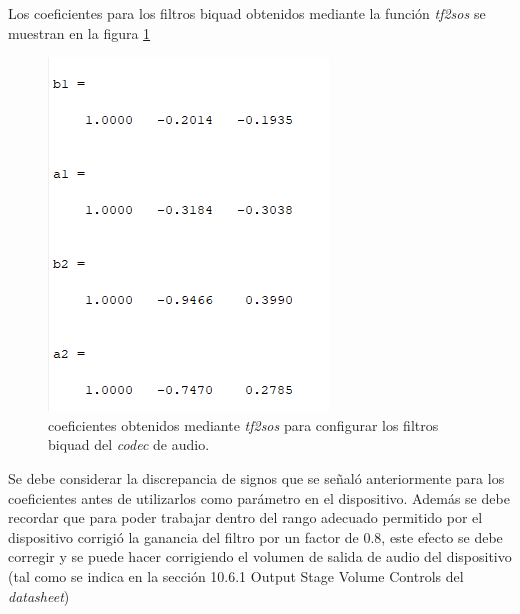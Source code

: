 \begin{enumerate}
Los coeficientes para los filtros biquad obtenidos mediante la función \textit{tf2sos} se muestran en la figura \ref{parámetros}

\begin{figure}[H]
    \centering
    \includegraphics[scale = 0.6]{figures/parametros.png}
    \caption{coeficientes obtenidos mediante \textit{tf2sos} para configurar los filtros biquad del \textit{codec} de audio.}
    \label{parámetros}
\end{figure}
    
    
Se debe considerar la discrepancia de signos que se señaló anteriormente para los coeficientes antes de utilizarlos como parámetro en el dispositivo. Además se debe recordar que para poder trabajar dentro del rango adecuado permitido por el dispositivo corrigió la ganancia  del filtro por un factor de 0.8, este efecto se debe corregir y se puede hacer corrigiendo el volumen de salida de audio del dispositivo (tal como se indica en la sección 10.6.1 Output Stage Volume Controls del \textit{datasheet})



\end{enumerate}